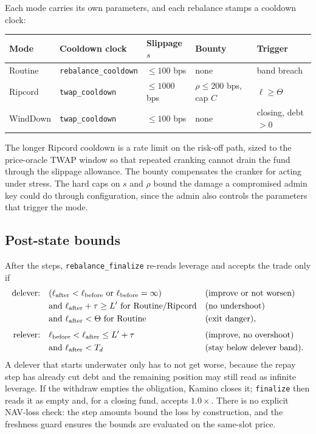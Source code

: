 \documentclass[11pt]{article}
\theoremstyle{remark}
\newcommand{\Lev}{\ell}
\begin{document}
Each mode carries its own parameters, and each rebalance stamps a cooldown clock:

\begin{center}
\small
\begin{tabular}{@{}lllll@{}}
\toprule
Mode & Cooldown clock & Slippage $s$ & Bounty & Trigger \\
\midrule
Routine & \texttt{rebalance\_cooldown} & $\le 100$ bps & none & band breach \\
Ripcord & \texttt{twap\_cooldown} & $\le 1000$ bps & $\rho \le 200$ bps, cap $C$ & $\Lev \ge \Theta$ \\
WindDown & \texttt{twap\_cooldown} & $\le 100$ bps & none & closing, debt $>0$ \\
\bottomrule
\end{tabular}
\end{center}

The longer Ripcord cooldown is a rate limit on the risk-off path, sized to the price-oracle TWAP window so that repeated cranking cannot drain the fund through the slippage allowance. The bounty compensates the cranker for acting under stress. The hard caps on $s$ and $\rho$ bound the damage a compromised admin key could do through configuration, since the admin also controls the parameters that trigger the mode.

\subsection{Post-state bounds}
\label{sec:bounds}

After the steps, \texttt{rebalance\_finalize} re-reads leverage and accepts the trade only if
\begin{align}
\text{delever:}\quad
&(\Lev_{\mathrm{after}} < \Lev_{\mathrm{before}} \ \text{or}\ \Lev_{\mathrm{before}} = \infty)
&&\text{(improve or not worsen)}\notag\\
&\text{and } \Lev_{\mathrm{after}} + \tau \ge L' \ \text{for Routine/Ripcord}
&&\text{(no undershoot)}\notag\\
&\text{and } \Lev_{\mathrm{after}} < \Theta \ \text{for Routine}
&&\text{(exit danger)},\\[4pt]
\text{relever:}\quad
&\Lev_{\mathrm{before}} < \Lev_{\mathrm{after}} \le L' + \tau
&&\text{(improve, no overshoot)}\notag\\
&\text{and } \Lev_{\mathrm{after}} < T_d
&&\text{(stay below delever band)}.\notag
\end{align}
A delever that starts underwater only has to not get worse, because the repay step has already cut debt and the remaining position may still read as infinite leverage. If the withdraw empties the obligation, Kamino closes it; \texttt{finalize} then reads it as empty and, for a closing fund, accepts $1.0\times$. There is no explicit NAV-loss check: the step amounts bound the loss by construction, and the freshness guard ensures the bounds are evaluated on the same-slot price.
\end{document}
